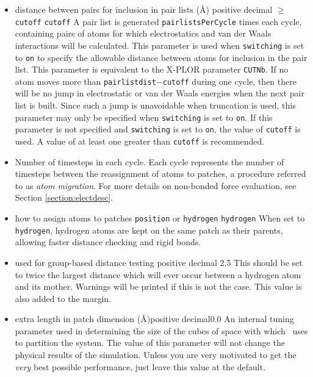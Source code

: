 \begin{itemize}

\item
{}
{distance between pairs for inclusion in pair lists (\AA)}
{positive decimal $\geq$ {\tt cutoff}}
{{\tt cutoff}}
{
A pair list is generated {\tt pairlistsPerCycle} times each cycle, 
containing pairs of atoms for which 
electrostatics and van der Waals interactions will be calculated.
This parameter is used when {\tt switching} is set to {\tt on} to
specify the allowable distance between atoms for inclusion in the
pair list.  
This parameter is equivalent to the X-PLOR parameter {\tt CUTNb}.
If no atom moves more than {\tt pairlistdist}$-${\tt cutoff} during
one cycle, then there will be no jump in electrostatic or van der
Waals energies when the next pair list is built.  Since such a jump
is unavoidable when truncation is used, this parameter may only
be specified when {\tt switching} is set to {\tt on}.  If this
parameter is not specified and {\tt switching} is set to {\tt on},
the value of {\tt cutoff} is used.  
A value of at least one greater than {\tt cutoff} is recommended.  
}

\item
{}
{Number of timesteps in each cycle.  Each cycle represents the number 
of timesteps between the reassignment of atoms to patches, a procedure
referred to as \emph{atom migration}.
For more details on non-bonded force evaluation, see
Section \ref{section:electdesc}.}

\item
{}
{how to assign atoms to patches}
{{\tt position} or {\tt hydrogen}}
{{\tt hydrogen}}
{
When set to {\tt hydrogen}, hydrogen atoms are kept on the same patch as their parents, allowing faster distance checking and rigid bonds.
}

\item
{}
{used for group-based distance testing}
{positive decimal}
{2.5}
{
This should be set to twice the largest distance which will ever occur between a hydrogen atom and its mother.  Warnings will be printed if this is not the case.  This value is also added to the margin.
}

\item
{}
{extra length in patch dimension (\AA)}{positive decimal}{0.0}
{An internal tuning parameter used in determining the size of the cubes 
of space with which \NAMD\ uses to partition the system.  The value of 
this parameter will not change the physical results of the simulation.  
Unless you are very motivated to get the {\it very} best 
possible performance, just leave this value at the default.}


\end{itemize}
